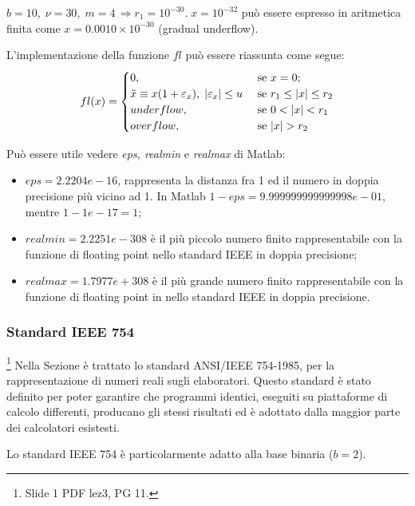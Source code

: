 \begin{example}
	$b=10,\; \nu=30,\; m=4\, \Rightarrow r_1=10^{-30}.\; x=10^{-32}$ può essere espresso in aritmetica finita come $x=0.0010\times 10^{-30}$ (gradual underflow).
\end{example}

L'implementazione della funzione $fl$ può essere riassunta come segue:
\begin{align*}
	fl(x)=\begin{cases}
		0, &\text{ se } x=0;\\
		\Tilde{x}\equiv x(1+\varepsilon_x),\; |\varepsilon_x|\leq u &\text{ se } r_1\leq|x|\leq r_2\\
		underflow, &\text{ se } 0<|x|<r_1\\
		overflow, &\text{ se } |x|>r_2
	\end{cases}
\end{align*}

\begin{remark}\label{rem:epsRMaxRmin}
	Può essere utile vedere \textit{eps, realmin} e \textit{realmax} di Matlab:
\end{remark}

\begin{itemize}
	\item $eps =  2.2204e-16$, rappresenta la distanza fra 1 ed il numero in doppia precisione più vicino ad 1. In Matlab $1 - eps = 9.999999999999998e-01$, mentre $1 - 1e-17 = 1$;
	\item $realmin = 2.2251e-308$ è il più piccolo numero finito rappresentabile con la funzione di floating point nello standard IEEE in doppia precisione;
	\item $realmax = 1.7977e+308$ è il più grande numero finito rappresentabile con la funzione di floating point in nello standard IEEE in doppia precisione.
\end{itemize}

\subsubsection{Standard IEEE 754}\footnote{Slide 1 PDF lez3, PG 11.}
Nella Sezione è trattato lo standard ANSI/IEEE 754-1985, per la rappresentazione di numeri reali sugli elaboratori. Questo standard è stato definito per poter garantire che programmi identici, eseguiti su piattaforme di calcolo differenti, producano gli stessi risultati ed è adottato dalla maggior parte dei calcolatori esistesti. 

Lo standard IEEE 754 è particolarmente adatto alla base binaria ($b=2$).

